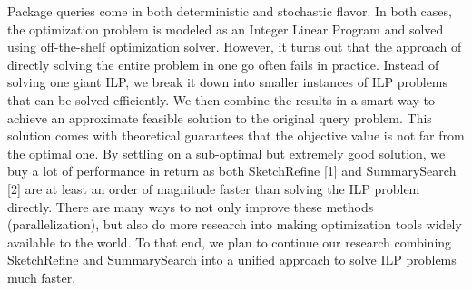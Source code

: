 \documentclass[a4paper,12pt]{article}
\begin{document}
Package queries come in both deterministic and stochastic flavor. In both cases, the optimization problem is modeled as an Integer Linear Program and solved using off-the-shelf optimization solver. However, it turns out that the approach of directly solving the entire problem in one go often fails in practice. Instead of solving one giant ILP, we break it down into smaller instances of ILP problems that can be solved efficiently. We then combine the results in a smart way to achieve an approximate feasible solution to the original query problem. This solution comes with theoretical guarantees that the objective value is not far from the optimal one. By settling on a sub-optimal but extremely good solution, we buy a lot of performance in return as both SketchRefine [1] and SummarySearch [2] are at least an order of magnitude faster than solving the ILP problem directly. There are many ways to not only improve these methods (parallelization), but also do more research into making optimization tools widely available to the world. To that end, we plan to continue our research combining SketchRefine and SummarySearch into a unified approach to solve ILP problems much faster. 
\\


\end{document}
